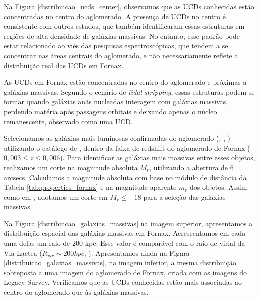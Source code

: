 Na Figura \ref{distribuicao_ucds_center}, observamos que as UCDs conhecidas estão concentradas no centro do aglomerado. A presença de UCDs no centro é consistente com outros estudos, que também identificaram essas estruturas em regiões de alta densidade de galáxias massivas. No entanto, esse padrão pode estar relacionado ao viés das pesquisas espectroscópicas, que tendem a se concentrar nas áreas centrais do aglomerado, e não necessariamente reflete a distribuição real das UCDs em Fornax.


As UCDs em Fornax estão concentradas no centro do aglomerado e próximas a galáxias massivas. Segundo o cenário de {\it tidal stripping}, essas estruturas podem se formar quando galáxias anãs nucleadas interagem com galáxias massivas, perdendo matéria após passagens orbitais e deixando apenas o núcleo remanescente, observado como uma UCD.

Selecionamos as galáxias mais luminosas confirmadas do aglomerado (\citealp{Ferguson_1989}, \citealp{Jordan_2007}, \citealp{Venhola_2018}) utilizando o catálogo de \cite{Lima_2024}, dentro da faixa de redshift do aglomerado de Fornax ($0,003\leq z\leq0,006$). Para identificar as galáxias mais massivas entre esses objetos, realizamos um corte na magnitude absoluta $M_r$, utilizando a abertura de 6 arcsecs. Calculamos a magnitude absoluta com base no módulo de distância da Tabela \ref{tab:properties_fornax} e na magnitude aparente $m_r$ dos objetos. Assim como em \cite{Saifollahi_2021}, adotamos um corte em $M_r \leq -18$ para a seleção das galáxias massivas.

Na Figura \ref{distribuicao_galaxias_massivas} na imagem superior, apresentamos a distribuição espacial das galáxias massivas em Fornax. Acrescentamos em cada uma delas um raio de 200 kpc. Esse valor é comparável com o raio de virial da Via Lactea ($R_{vir}\sim 200kpc$, \cite{Dehnen_2006}). Apresentamos ainda na Figura \ref{distribuicao_galaxias_massivas}, na imagem inferior, a mesma distribuição sobreposta a uma imagem do aglomerado de Fornax, criada com as imagens do Legacy Survey. Verificamos que as UCDs conhecidas estão mais associadas ao centro do aglomerado que às galáxias massivas.

